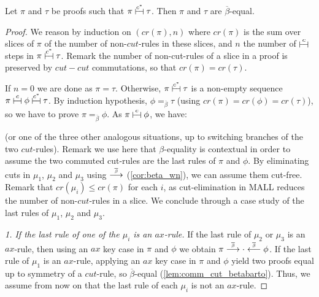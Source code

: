 \documentclass{lmcs}
\newcommand*{\orth}{^\perp} %
\renewcommand*{\fCenter}{\vdash} %
\newcommand*{\Rcut}[1]{
    \RightLabel{$cut$}
    \BinaryInfC{$\fCenter$ #1}
}
\newcommand*{\Rsub}[2]{
    \AxiomC{#1}
    \noLine
    \UnaryInfC{$\fCenter$ #2}
}
\newcommand*{\eqeq}{=} %
\newcommand{\symboltext}[2]{\mathrel{\overset{\makebox[0pt]{\mbox{\normalfont\tiny\sffamily \ensuremath{#1}}}}{#2}}} %
\newcommand{\betabar}{\overline{\beta}}
\newcommand{\betabarto}{\symboltext{\betabar}{\longrightarrow}}
\newcommand{\betabarfrom}{\symboltext{\betabar}{\longleftarrow}}
\newcommand{\vdashv}{\mathrel{\lower .22ex \hbox{$\vdash\!\dashv$}}}
\DeclareRobustCommand{\astsymbol}[1]{\mathrel{\ooalign{{$\vdashv$}\crcr{$\stackrel{#1}{\hphantom{\vdashv}\vphantom{\to}}$}}}}
\newcommand{\eqcc}{\astsymbol{c}} %
\newcommand{\eqccast}{\astsymbol{c^\ast}} %
\newcommand{\eqbb}{\mathrel{\eqeq_{\betabar}}}
\newcommand*{\proofpar}[1]{\textit{#1}}
\begin{document}
\begin{lem}
\label{lem:eqbb_eqb}
Let $\pi$ and $\tau$ be proofs such that $\pi \eqccast \tau$.
Then $\pi$ and $\tau$ are $\betabar$-equal.
\end{lem}
\begin{proof}
We reason by induction on $(cr(\pi), n)$ where $cr(\pi)$ is the sum over slices of $\pi$ of the number of non-$cut$-rules in these slices, and $n$ the number of  $\eqcc$ steps in $\pi \eqccast \tau$.
Remark the number of non-cut-rules of a slice in a proof is preserved by $cut-cut$ commutations, so that $cr(\pi) = cr(\tau)$.

If $n = 0$ we are done as $\pi = \tau$.
Otherwise, $\pi \eqccast \tau$ is a non-empty sequence $\pi \eqcc \phi \eqccast \tau$.
By induction hypothesis, $\phi \eqbb \tau$ (using $cr(\pi) = cr(\phi) = cr(\tau)$), so we have to prove $\pi \eqbb \phi$.
As $\pi \eqcc \phi$, we have:

(or one of the three other analogous situations, up to switching branches of the two $cut$-rules).
Remark we use here that $\beta$-equality is contextual in order to assume the two commuted cut-rules are the last rules of $\pi$ and $\phi$.
By eliminating cuts in $\mu_1$, $\mu_2$ and $\mu_3$ using $\betabarto$ (\autoref{cor:beta_wn}), we can assume them cut-free.
Remark that $cr(\mu_i) \leq cr(\pi)$ for each $i$, as cut-elimination in MALL reduces the number of non-$cut$-rules in a slice.
We conclude through a case study of the last rules of $\mu_1$, $\mu_2$ and $\mu_3$.

\proofpar{1. If the last rule of one of the $\mu_i$ is an $ax$-rule.}
If the last rule of $\mu_2$ or $\mu_3$ is an $ax$-rule, then using an $ax$ key case in $\pi$ and $\phi$ we obtain $\pi \betabarto \cdot \betabarfrom \phi$.
If the last rule of $\mu_1$ is an $ax$-rule, applying an $ax$ key case in $\pi$ and $\phi$ yield two proofs equal up to symmetry of a $cut$-rule, so $\betabar$-equal (\autoref{lem:comm_cut_betabarto}).
Thus, we assume from now on that the last rule of each $\mu_i$ is not an $ax$-rule.


\end{proof}
\end{document}
